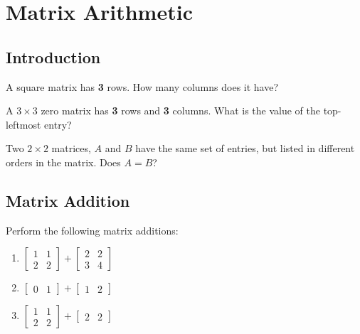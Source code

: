\documentclass[11pt]{exam}
\begin{document}
\pagebreak
\section{Matrix Arithmetic}

    \vspace{20px}
    \subsection{Introduction}
        \begin{questions}
            \item A square matrix has \textbf{3} rows. How many columns does it have?
            \item A $3 \times 3$ zero matrix has \textbf{3} rows and \textbf{3} columns. What is the value of the top-leftmost entry?
            \item Two $2 \times 2$ matrices, $A$ and $B$ have the same set of entries, but listed in different orders in the matrix. Does $A = B$?
        \end{questions}

    \vspace{20px}
    \subsection{Matrix Addition}
        \begin{questions}
            \item Perform the following matrix additions:
            \begin{enumerate}
                \item $\begin{bmatrix} 1 & 1 \\ 2 & 2 \end{bmatrix} + \begin{bmatrix} 2 & 2 \\ 3 & 4 \end{bmatrix}$
                \item $\begin{bmatrix} 0 & 1 \end{bmatrix} + \begin{bmatrix} 1 & 2 \end{bmatrix}$
                \item $\begin{bmatrix} 1 & 1 \\ 2 & 2 \end{bmatrix} + \begin{bmatrix} 2 & 2 \end{bmatrix}$
            \end{enumerate}
        \end{questions}
\end{document}
